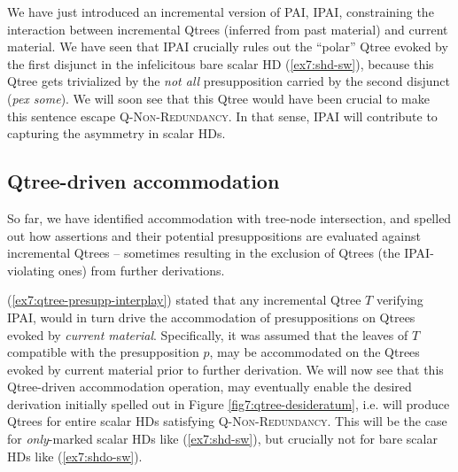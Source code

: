 We have just introduced an incremental version of PAI, IPAI, constraining the interaction between incremental Qtrees (inferred from past material) and current material. We have seen that IPAI crucially rules out the ``polar'' Qtree evoked by the first disjunct in the infelicitous bare scalar HD (\ref{ex7:shd-sw}), because this Qtree gets trivialized by the \textit{not all} presupposition carried by the second disjunct (\textit{pex some}). We will soon see that this Qtree would have been crucial to make this sentence escape \textsc{Q-Non-Redundancy}. In that sense, IPAI will contribute to capturing the asymmetry in scalar HDs.


\subsection{Qtree-driven accommodation}
So far, we have identified accommodation with tree-node intersection, and spelled out how assertions and their potential presuppositions are evaluated against incremental Qtrees -- sometimes resulting in the exclusion of Qtrees (the IPAI-violating ones) from further derivations.

(\ref{ex7:qtree-presupp-interplay}) stated that any incremental Qtree $T$ verifying IPAI, would in turn drive the accommodation of presuppositions on Qtrees evoked by \textit{current material}. Specifically, it was assumed that the leaves of $T$ compatible with the presupposition $p$, may be accommodated on the Qtrees evoked by current material prior to further derivation. We will now see that this Qtree-driven accommodation operation, may eventually enable the desired derivation initially spelled out in Figure \ref{fig7:qtree-desideratum}, i.e. will produce Qtrees for entire scalar HDs satisfying \textsc{Q-Non-Redundancy}. This will be the case for \textit{only}-marked scalar HDs like (\ref{ex7:shd-sw}), but crucially not for bare scalar HDs like (\ref{ex7:shdo-sw}).\\

